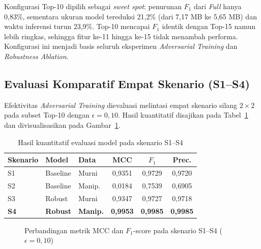 \documentclass[10pt,twocolumn,a4paper]{extarticle}
\begin{document}
Konfigurasi Top-10 dipilih sebagai \textit{sweet spot}: penurunan $F_1$ dari \textit{Full} hanya 0,83\%, sementara ukuran model tereduksi 21,2\% (dari 7,17 MB ke 5,65 MB) dan waktu inferensi turun 23,9\%. Top-10 mencapai $F_1$ identik dengan Top-15 namun lebih ringkas, sehingga fitur ke-11 hingga ke-15 tidak menambah performa. Konfigurasi ini menjadi basis seluruh eksperimen \textit{Adversarial Training} dan \textit{Robustness Ablation}.

\subsection{Evaluasi Komparatif Empat Skenario (S1--S4)}
Efektivitas \textit{Adversarial Training} dievaluasi melintasi empat skenario silang $2\times 2$ pada subset Top-10 dengan $\epsilon = 0{,}10$. Hasil kuantitatif disajikan pada Tabel~\ref{tab:results_4_scenarios} dan divisualisasikan pada Gambar~\ref{fig:4_scenarios_comparison}.

\begin{table}[htbp]
\caption{Hasil kuantitatif evaluasi model pada skenario S1--S4}
\label{tab:results_4_scenarios}
\centering
\footnotesize
\begin{tabularx}{\linewidth}{@{} X l l c c c @{}}
\toprule
\textbf{Skenario} & \textbf{Model} & \textbf{Data} & \textbf{MCC} & \textbf{$F_1$} & \textbf{Prec.} \\ \midrule
S1 & Baseline & Murni & 0,9351 & 0,9729 & 0,9720 \\
S2 & Baseline & Manip. & 0,0184 & 0,7539 & 0,6905 \\
S3 & Robust & Murni & 0,9347 & 0,9727 & 0,9718 \\
\textbf{S4} & \textbf{Robust} & \textbf{Manip.} & \textbf{0,9953} & \textbf{0,9985} & \textbf{0,9985} \\ \bottomrule
\end{tabularx}
\end{table}

\begin{figure}[htbp]
\centering
{}
\caption{Perbandingan metrik MCC dan $F_1$-score pada skenario S1--S4 ($\epsilon = 0{,}10$)}
\label{fig:4_scenarios_comparison}
\end{figure}
\end{document}
